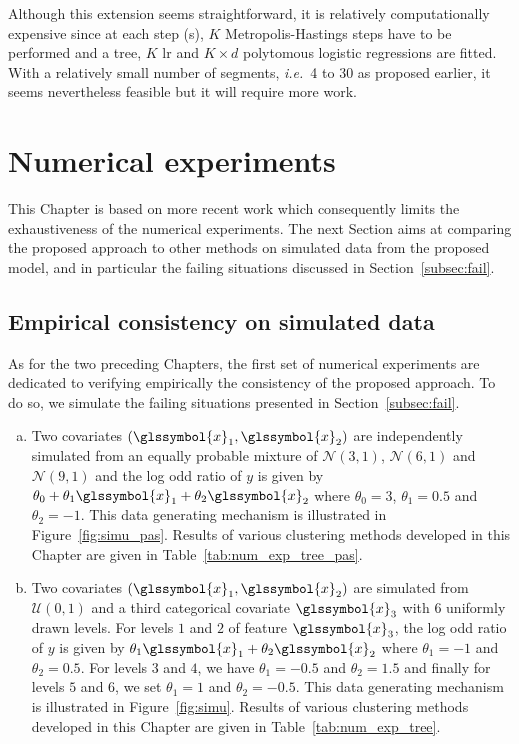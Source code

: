 Although this extension seems straightforward, it is relatively computationally expensive since at each step (s), $K$ Metropolis-Hastings steps have to be performed and a tree, $K$ \gls{lr} and $K \times d$ polytomous logistic regressions are fitted. With a relatively small number of segments, \textit{i.e.}\ 4 to 30 as proposed earlier, it seems nevertheless feasible but it will require more work.

\section{Numerical experiments} \label{sec:num_exp}

This Chapter is based on more recent work which consequently limits the exhaustiveness of the numerical experiments. The next Section aims at comparing the proposed approach to other methods on simulated data from the proposed model, and in particular the failing situations discussed in Section~\ref{subsec:fail}.

\subsection{Empirical consistency on simulated data} \label{subsec:num_sim}

As for the two preceding Chapters, the first set of numerical experiments are dedicated to verifying empirically the consistency of the proposed approach. To do so, we simulate the failing situations presented in Section~\ref{subsec:fail}.

\begin{enumerate}[(a)]
\item Two covariates $(\glssymbol{x}_1,\glssymbol{x}_2)$ are independently simulated from an equally probable mixture of $\mathcal{N}(3,1)$, $\mathcal{N}(6,1)$ and $\mathcal{N}(9,1)$ and the log odd ratio of $y$ is given by $\theta_0 + \theta_1 \glssymbol{x}_1 + \theta_2 \glssymbol{x}_2$ where $\theta_0 = 3$, $\theta_1 = 0.5$ and $\theta_2 = -1$. This data generating mechanism is illustrated in Figure~\ref{fig:simu_pas}. Results of various clustering methods developed in this Chapter are given in Table~\ref{tab:num_exp_tree_pas}.
\item Two covariates $(\glssymbol{x}_1,\glssymbol{x}_2)$ are simulated from $\mathcal{U}(0,1)$ and a third categorical covariate $\glssymbol{x}_3$ with 6 uniformly drawn levels. For levels $1$ and $2$ of feature $\glssymbol{x}_3$, the log odd ratio of $y$ is given by $\theta_1 \glssymbol{x}_1 + \theta_2 \glssymbol{x}_2$ where $\theta_1 = -1$ and $\theta_2 = 0.5$. For levels $3$ and $4$, we have $\theta_1 = -0.5$ and $\theta_2 = 1.5$ and finally for levels $5$ and $6$, we set $\theta_1 = 1$ and $\theta_2 = -0.5$. This data generating mechanism is illustrated in Figure~\ref{fig:simu}. Results of various clustering methods developed in this Chapter are given in Table~\ref{tab:num_exp_tree}.
\end{enumerate}

